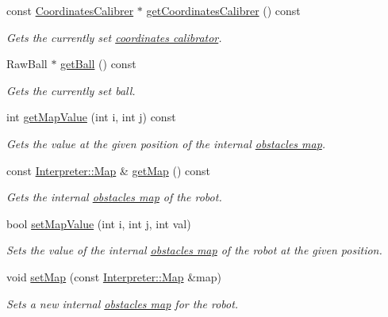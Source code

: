 \begin{DoxyCompactItemize}
const \hyperlink{classCoordinatesCalibrer}{CoordinatesCalibrer} $\ast$ \hyperlink{classTeamRobot_a3ef7d4538226085ed4d92b8bd2fce67d}{getCoordinatesCalibrer} () const 
\begin{DoxyCompactList}\small\item\em Gets the currently set \hyperlink{classCoordinatesCalibrer}{coordinates calibrator}. \item\end{DoxyCompactList}\item 
RawBall $\ast$ \hyperlink{classTeamRobot_a86dbc3bbf6fdcebd4ae41a6f68d92a15}{getBall} () const 
\begin{DoxyCompactList}\small\item\em Gets the currently set ball. \item\end{DoxyCompactList}\item 
int \hyperlink{classTeamRobot_abc3a5d2d4cac44629a9d8851164b5eda}{getMapValue} (int i, int j) const 
\begin{DoxyCompactList}\small\item\em Gets the value at the given position of the internal \hyperlink{classInterpreter_a4c080f069f557cf92dfe803117a6ea53}{obstacles map}. \item\end{DoxyCompactList}\item 
const \hyperlink{classMatrix}{Interpreter::Map} \& \hyperlink{classTeamRobot_a8b5fa0d9f42166fc3339ec901fad5a91}{getMap} () const 
\begin{DoxyCompactList}\small\item\em Gets the internal \hyperlink{classInterpreter_a4c080f069f557cf92dfe803117a6ea53}{obstacles map} of the robot. \item\end{DoxyCompactList}\item 
bool \hyperlink{classTeamRobot_a28ee2460e7d465989bb0582782db851e}{setMapValue} (int i, int j, int val)
\begin{DoxyCompactList}\small\item\em Sets the value of the internal \hyperlink{classInterpreter_a4c080f069f557cf92dfe803117a6ea53}{obstacles map} of the robot at the given position. \item\end{DoxyCompactList}\item 
void \hyperlink{classTeamRobot_ab8c92b6228aed8eef31d0b1b0fce8690}{setMap} (const \hyperlink{classMatrix}{Interpreter::Map} \&map)
\begin{DoxyCompactList}\small\item\em Sets a new internal \hyperlink{classInterpreter_a4c080f069f557cf92dfe803117a6ea53}{obstacles map} for the robot. \item\end{DoxyCompactList}\item 

\end{DoxyCompactItemize}
